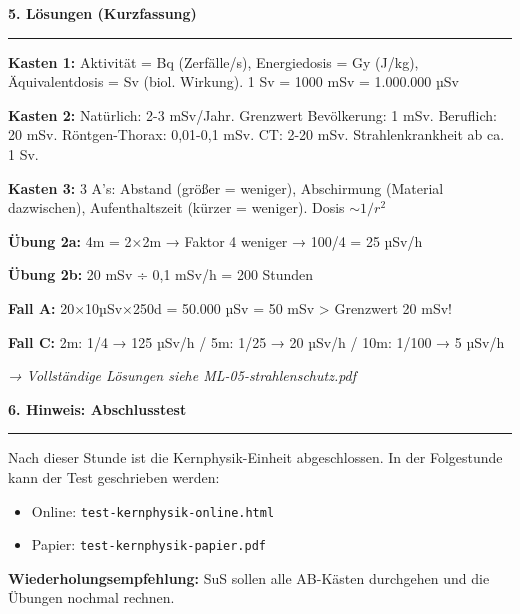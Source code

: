 \documentclass[11pt, a4paper]{article}
\newcommand{\abschnitt}[1]{%
    \vspace{10pt}\noindent\textbf{\textcolor{physik}{\large #1}}\vspace{6pt}\hrule\vspace{8pt}
}
\begin{document}
\abschnitt{5. Lösungen (Kurzfassung)}

\textbf{Kasten 1:} Aktivität = Bq (Zerfälle/s), Energiedosis = Gy (J/kg), Äquivalentdosis = Sv (biol. Wirkung). 1 Sv = 1000 mSv = 1.000.000 µSv

\textbf{Kasten 2:} Natürlich: 2-3 mSv/Jahr. Grenzwert Bevölkerung: 1 mSv. Beruflich: 20 mSv. Röntgen-Thorax: 0,01-0,1 mSv. CT: 2-20 mSv. Strahlenkrankheit ab ca. 1 Sv.

\textbf{Kasten 3:} 3 A's: Abstand (größer = weniger), Abschirmung (Material dazwischen), Aufenthaltszeit (kürzer = weniger). Dosis $\sim 1/r^2$

\textbf{Übung 2a:} 4m = 2×2m → Faktor 4 weniger → 100/4 = 25 µSv/h

\textbf{Übung 2b:} 20 mSv ÷ 0,1 mSv/h = 200 Stunden

\textbf{Fall A:} 20×10µSv×250d = 50.000 µSv = 50 mSv > Grenzwert 20 mSv!

\textbf{Fall C:} 2m: 1/4 → 125 µSv/h / 5m: 1/25 → 20 µSv/h / 10m: 1/100 → 5 µSv/h

\vspace{8pt}
\textit{→ Vollständige Lösungen siehe ML-05-strahlenschutz.pdf}

\vspace{12pt}

\abschnitt{6. Hinweis: Abschlusstest}

Nach dieser Stunde ist die Kernphysik-Einheit abgeschlossen. In der Folgestunde kann der Test geschrieben werden:

\begin{itemize}
\item Online: \texttt{test-kernphysik-online.html}
\item Papier: \texttt{test-kernphysik-papier.pdf}
\end{itemize}

\textbf{Wiederholungsempfehlung:} SuS sollen alle AB-Kästen durchgehen und die Übungen nochmal rechnen.
\end{document}
